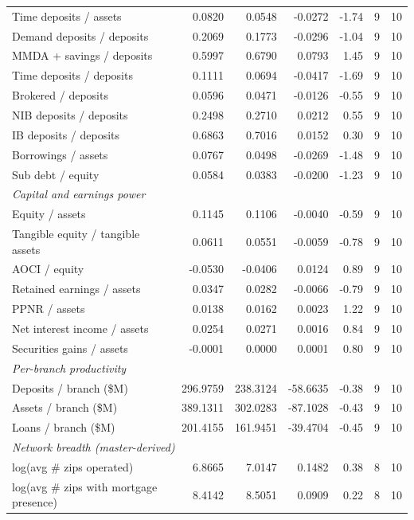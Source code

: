\begin{tabular}{lrrrrrr}
Time deposits / assets & 0.0820 & 0.0548 & -0.0272 & -1.74 & 9 & 10 \\
Demand deposits / deposits & 0.2069 & 0.1773 & -0.0296 & -1.04 & 9 & 10 \\
MMDA + savings / deposits & 0.5997 & 0.6790 & 0.0793 & 1.45 & 9 & 10 \\
Time deposits / deposits & 0.1111 & 0.0694 & -0.0417 & -1.69 & 9 & 10 \\
Brokered / deposits & 0.0596 & 0.0471 & -0.0126 & -0.55 & 9 & 10 \\
NIB deposits / deposits & 0.2498 & 0.2710 & 0.0212 & 0.55 & 9 & 10 \\
IB deposits / deposits & 0.6863 & 0.7016 & 0.0152 & 0.30 & 9 & 10 \\
Borrowings / assets & 0.0767 & 0.0498 & -0.0269 & -1.48 & 9 & 10 \\
Sub debt / equity & 0.0584 & 0.0383 & -0.0200 & -1.23 & 9 & 10 \\
\midrule
\multicolumn{7}{l}{\emph{Capital and earnings power}} \\
\midrule
Equity / assets & 0.1145 & 0.1106 & -0.0040 & -0.59 & 9 & 10 \\
Tangible equity / tangible assets & 0.0611 & 0.0551 & -0.0059 & -0.78 & 9 & 10 \\
AOCI / equity & -0.0530 & -0.0406 & 0.0124 & 0.89 & 9 & 10 \\
Retained earnings / assets & 0.0347 & 0.0282 & -0.0066 & -0.79 & 9 & 10 \\
PPNR / assets & 0.0138 & 0.0162 & 0.0023 & 1.22 & 9 & 10 \\
Net interest income / assets & 0.0254 & 0.0271 & 0.0016 & 0.84 & 9 & 10 \\
Securities gains / assets & -0.0001 & 0.0000 & 0.0001 & 0.80 & 9 & 10 \\
\midrule
\multicolumn{7}{l}{\emph{Per-branch productivity}} \\
\midrule
Deposits / branch (\$M) & 296.9759 & 238.3124 & -58.6635 & -0.38 & 9 & 10 \\
Assets / branch (\$M) & 389.1311 & 302.0283 & -87.1028 & -0.43 & 9 & 10 \\
Loans / branch (\$M) & 201.4155 & 161.9451 & -39.4704 & -0.45 & 9 & 10 \\
\midrule
\multicolumn{7}{l}{\emph{Network breadth (master-derived)}} \\
\midrule
log(avg \# zips operated) & 6.8665 & 7.0147 & 0.1482 & 0.38 & 8 & 10 \\
log(avg \# zips with mortgage presence) & 8.4142 & 8.5051 & 0.0909 & 0.22 & 8 & 10 \\

\end{tabular}
